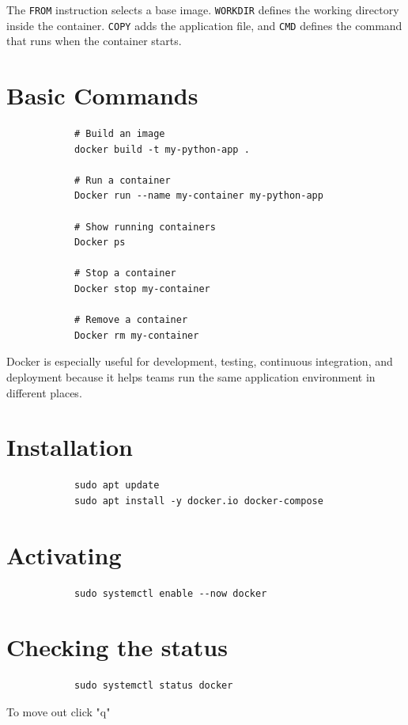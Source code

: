 \documentclass[a4paper]{article}
\begin{document}
        The \texttt{FROM} instruction selects a base image. \texttt{WORKDIR} defines the working directory inside the container. \texttt{COPY} adds the application file, and \texttt{CMD} defines the command that runs when the container starts.
    
    
    \section{Basic Commands}
        
        \begin{verbatim}
            # Build an image
            docker build -t my-python-app .
            
            # Run a container
            Docker run --name my-container my-python-app
            
            # Show running containers
            Docker ps
            
            # Stop a container
            Docker stop my-container
            
            # Remove a container
            Docker rm my-container
        \end{verbatim}
        
        Docker is especially useful for development, testing, continuous integration, and deployment because it helps teams run the same application environment in different places.
    
    
    \section{Installation}
        \begin{verbatim}
            sudo apt update
            sudo apt install -y docker.io docker-compose
        \end{verbatim}
    
    
    \section{Activating}
        \begin{verbatim}
            sudo systemctl enable --now docker
        \end{verbatim}
    
    
    \section{Checking the status}
        \begin{verbatim}
            sudo systemctl status docker
        \end{verbatim}
        To move out click "q"
    
\end{document}
